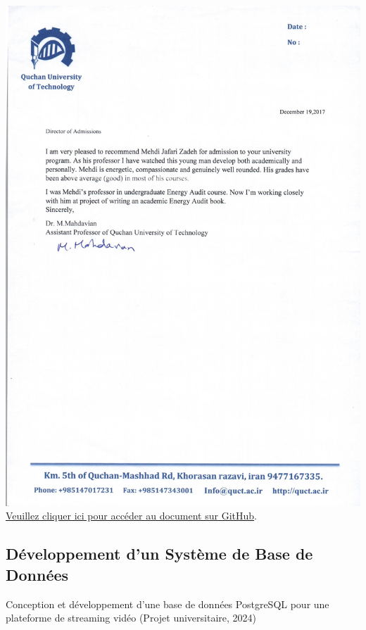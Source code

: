 \documentclass{article}
\begin{document}
        \begin{center}
            \includegraphics[width=\textwidth,height=\textheight,keepaspectratio]{../Document/Projets/Co-author/19-12-2017 lettre de recommandation - Dr. Mahdavian.jpg}
            \footnotesize
             \href{https://github.com/jafarizadeh/CV---lettre/tree/a64fa195620766a9cf39fd42a2fd963779d13f6f/Document/Projets/Co-author}{Veuillez cliquer ici pour accéder au document sur GitHub}.
        \end{center}
    


    \subsection{Développement d'un Système de Base de Données}

    Conception et développement d'une base de données PostgreSQL pour une plateforme de streaming vidéo (Projet universitaire, 2024)
\end{document}
